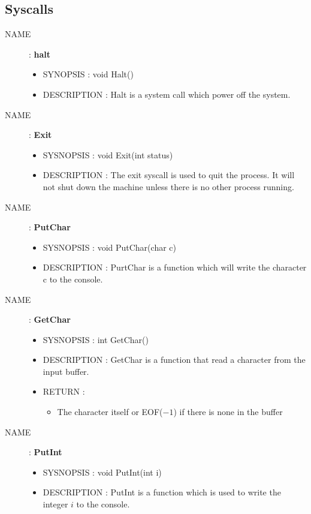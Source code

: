\subsection{Syscalls}
\begin{description}
    \item [NAME] : \textbf{halt}
        \begin{itemize}
            \item SYNOPSIS : void Halt()
            \item DESCRIPTION :
                Halt is a system call which power off the system.
        \end{itemize}


    \item [NAME] : \textbf{Exit}
        \begin{itemize}
            \item SYSNOPSIS : void Exit(int status)
            \item DESCRIPTION :
                The exit syscall is used to quit the process. It will not shut down the
                machine unless there is no other process running.
        \end{itemize}

    \item [NAME] : \textbf{PutChar}
        \begin{itemize}
            \item SYSNOPSIS : void PutChar(char c)
            \item DESCRIPTION :
                PurtChar is a function which will write the character c to the console.
        \end{itemize}

    \item [NAME] : \textbf{GetChar}
        \begin{itemize}
            \item SYSNOPSIS : int GetChar()
            \item DESCRIPTION :
                GetChar is a function that read a character from the input buffer.
            \item RETURN :
                \begin{itemize}
                    \item The character itself or EOF($-1$) if there is none in the buffer
                \end{itemize}
        \end{itemize}

    \item [NAME] : \textbf{PutInt}
        \begin{itemize}
            \item SYSNOPSIS : void PutInt(int i)
            \item DESCRIPTION :
                PutInt is a function which is used to write the integer $i$ to the console.
        \end{itemize}


\end{description}
